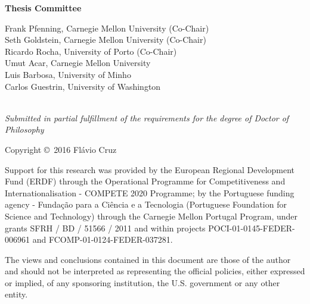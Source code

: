 \begin{center}

{\bf Thesis Committee \\}

Frank Pfenning, Carnegie Mellon University (Co-Chair)\\
Seth Goldstein, Carnegie Mellon University (Co-Chair)\\
Ricardo Rocha, University of Porto (Co-Chair)\\
Umut Acar, Carnegie Mellon University\\
Luis Barbosa, University of Minho\\
Carlos Guestrin, University of Washington\\\
\vspace{0.2in}

\emph{Submitted in partial fulfillment of the requirements for the degree of Doctor of Philosophy}

\vspace{0.1in}

Copyright \copyright\ 2016 Fl\'{a}vio Cruz

\vspace{0.2in}

{\medskip\footnotesize\noindent
Support for this research was provided by the European Regional Development
Fund (ERDF) through the Operational Programme for Competitiveness and
Internationalisation - COMPETE 2020 Programme; by the Portuguese funding agency
- Funda\c{c}\~{a}o para a Ci\^{e}ncia e a
Tecnologia (Portuguese Foundation for Science and Technology) through the
Carnegie Mellon Portugal Program, under grants SFRH / BD / 51566 / 2011 and
within projects POCI-01-0145-FEDER-006961 and FCOMP-01-0124-FEDER-037281.

The views and conclusions contained in this document are those of the author and
should not be interpreted as representing the official policies, either
expressed or implied, of any sponsoring institution, the U.S. government or any
other entity.
\par}

\end{center}

